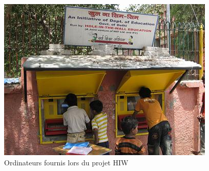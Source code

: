 \begin{figure}[H]
  \centering
  \includegraphics[width=\textwidth]{../resources/illustrations/hiw_1}
  \caption{Ordinateurs fournis lors du projet \gls{HIW}}
\end{figure}

